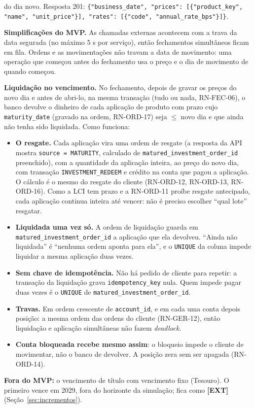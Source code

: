 \documentclass[11pt,a4paper]{article}
\newcommand{\dec}{\textbf{[DEC]}}          %
\newcommand{\ext}{\textbf{[EXT]}}          %
\newcommand{\tb}[1]{\texttt{#1}}           %
\begin{document}
\begin{regras}
  do dia novo.
  Resposta 201: \tb{\{"business_date", "prices": [\{"product_key", "name", "unit_price"\}],
  "rates": [\{"code", "annual_rate_bps"\}]\}}.
  \item[RN-FEC-08 \dec] \textbf{Simplificações do MVP.} As chamadas externas acontecem com a trava
  da data segurada (no máximo 5 s por serviço), então fechamentos simultâneos ficam em fila. Ordens
  e as movimentações não travam a data de movimento: uma operação que começou antes do fechamento
  usa o preço e o dia de movimento de quando começou.
  \item[RN-FEC-09 \dec] \textbf{Liquidação no vencimento.} No fechamento, depois de gravar os
  preços do novo dia e antes de abri-lo, na mesma transação (tudo ou nada, RN-FEC-06), o banco
  devolve o dinheiro de cada aplicação de produto com prazo cujo \tb{maturity_date} (gravado na
  ordem, RN-ORD-17) seja $\le$ novo dia e que ainda não tenha sido liquidada. Como funciona:
  \begin{itemize}
    \item \textbf{O resgate.} Cada aplicação vira uma ordem de resgate (a resposta da API mostra
    \tb{source = MATURITY}, calculado de \tb{matured_investment_order_id} preenchido), com a quantidade da
    aplicação inteira, ao preço do novo dia, com transação
    \tb{INVESTMENT_REDEEM} e crédito na conta que pagou a aplicação. O cálculo é o mesmo do resgate
    do cliente (RN-ORD-12, RN-ORD-13, RN-ORD-16). Como a LCI tem prazo e a RN-ORD-11
    proíbe resgate antecipado, cada aplicação continua inteira até vencer: não é preciso escolher
    ``qual lote'' resgatar.
    \item \textbf{Liquidada uma vez só.} A ordem de liquidação guarda em \tb{matured_investment_order_id} a
    aplicação que ela devolveu. ``Ainda não liquidada'' é ``nenhuma ordem aponta para ela'', e o
    \tb{UNIQUE} da coluna impede liquidar a mesma aplicação duas vezes.
    \item \textbf{Sem chave de idempotência.} Não há pedido de cliente para repetir: a transação
    da liquidação grava \tb{idempotency_key} nula. Quem impede pagar duas vezes é o \tb{UNIQUE} de
    \tb{matured_investment_order_id}.
    \item \textbf{Travas.} Em ordem crescente de \tb{account_id}, e em cada uma conta depois
    posição: a mesma ordem das ordens do cliente (RN-GER-12), então liquidação e aplicação
    simultâneas não fazem \emph{deadlock}.
    \item \textbf{Conta bloqueada recebe mesmo assim}: o bloqueio impede o cliente de movimentar,
    não o banco de devolver. A posição zera sem ser apagada (RN-ORD-14).
  \end{itemize}
  \textbf{Fora do MVP:} o vencimento de título com vencimento fixo (Tesouro). O primeiro vence em
  2029, fora do horizonte da simulação; fica como \ext{} (Seção~\ref{sec:incrementos}).
\end{regras}
\end{document}
